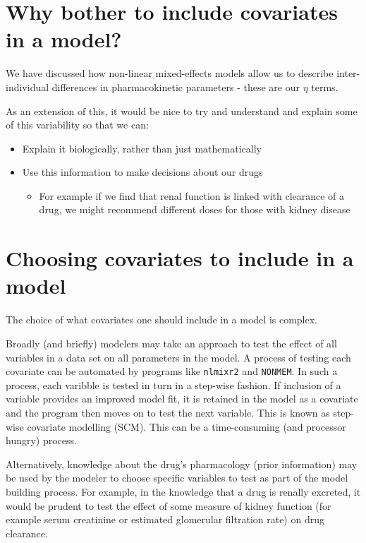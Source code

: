 \documentclass[
]{article}
\providecommand{\tightlist}{%
  \setlength{\itemsep}{0pt}\setlength{\parskip}{0pt}}
\begin{document}
\section{Why bother to include covariates in a model?}\label{why-bother-to-include-covariates-in-a-model}

We have discussed how non-linear mixed-effects models allow us to describe inter-individual differences in pharmacokinetic parameters - these are our \(\eta\) terms.

As an extension of this, it would be nice to try and understand and explain some of this variability so that we can:

\begin{itemize}
\tightlist
\item
  Explain it biologically, rather than just mathematically
\item
  Use this information to make decisions about our drugs

  \begin{itemize}
  \tightlist
  \item
    For example if we find that renal function is linked with clearance of a drug, we might recommend different doses for those with kidney disease
  \end{itemize}
\end{itemize}

\section{Choosing covariates to include in a model}\label{choosing-covariates-to-include-in-a-model}

The choice of what covariates one should include in a model is complex.

Broadly (and briefly) modelers may take an approach to test the effect of all variables in a data set on all parameters in the model. A process of testing each covariate can be automated by programs like \texttt{nlmixr2} and \texttt{NONMEM}. In such a process, each varibble is tested in turn in a step-wise fashion. If inclusion of a variable provides an improved model fit, it is retained in the model as a covariate and the program then moves on to test the next variable. This is known as step-wise covariate modelling (SCM). This can be a time-consuming (and processor hungry) process.

Alternatively, knowledge about the drug's pharmacology (prior information) may be used by the modeler to choose specific variables to test as part of the model building process. For example, in the knowledge that a drug is renally excreted, it would be prudent to test the effect of some measure of kidney function (for example serum creatinine or estimated glomerular filtration rate) on drug clearance.
\end{document}
